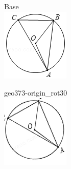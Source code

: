 \documentclass[12pt]{article}
\begin{document}
\begin{center}
\begin{minipage}{0.32\textwidth}\centering
Base\\
\includegraphics[width=0.95\linewidth]{out_rommath_origin/items/geo373-origin/assets/figure.png}
\end{minipage}
\hfill\begin{minipage}{0.32\textwidth}\centering
geo373-origin\_rot30\\
\includegraphics[width=0.95\linewidth]{out_rommath_origin/items/geo373-origin/assets/figure_rot30.png}

\end{minipage}
\end{center}
\end{document}
